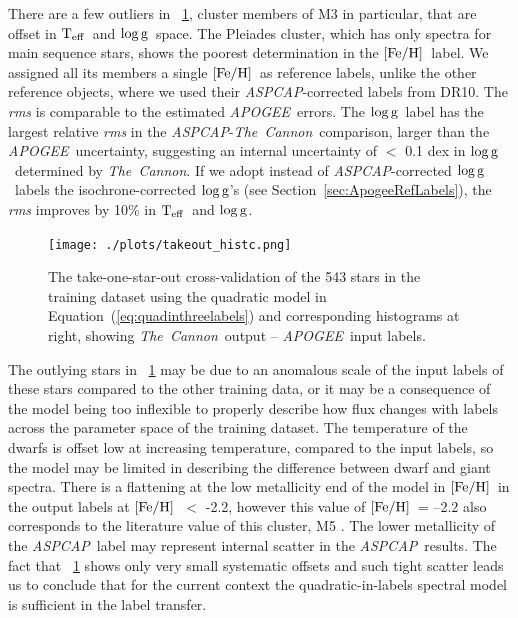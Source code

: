 \documentclass[12pt, preprint]{aastex}
\newcommand{\sectionname}{Section}
\newcommand{\tc}{\textsl{The~Cannon}}
\newcommand{\apogee}{\textsl{APOGEE}}
\newcommand{\aspcap}{\textsl{ASPCAP}}
\newcommand{\teff}{\mbox{$\rm T_{eff}$}}
\newcommand{\feh}{\mbox{$\rm [Fe/H]$}}
\newcommand{\logg}{\mbox{$\rm \log g$}}
\begin{document}
There are a few outliers in \figurename~\ref{fig:takeonestarout}, cluster members of M3 in particular, that are offset in \teff\ and \logg\ space. 
The Pleiades cluster, which has only spectra for main sequence stars, shows the poorest determination in the \feh\ label. We assigned all its members a single \feh ~as reference labels, unlike the other reference objects, where we used their \aspcap -corrected labels from DR10.
The \textit{rms} is comparable to the estimated \apogee\ errors. The \logg\ label has the largest relative \textit{rms} in the \aspcap\--\tc\ comparison, larger than the \apogee\ uncertainty, suggesting an internal uncertainty of $<$ 0.1 dex in \logg\ determined by \tc.
If we adopt instead of \aspcap -corrected \logg\ labels the isochrone-corrected \logg 's (see \sectionname~\ref{sec:ApogeeRefLabels}), the \textit{rms} improves by 10\% in \teff\ and \logg.

\begin{figure}[h!]
\centering
    \texttt{[image: ./plots/takeout\_histc.png]}
\caption{The take-one-star-out cross-validation of the 543 stars in the training dataset using the quadratic model in Equation~(\ref{eq:quadinthreelabels}) and corresponding histograms at right, showing \tc\ output -- \apogee\ input labels.}
\label{fig:takeonestarout}
\end{figure}


The outlying stars in \figurename~\ref{fig:takeonestarout} may be due to an anomalous scale of the input labels of these stars compared to the other training data, or it may be a consequence of the model being too inflexible to properly describe how flux changes with labels across the parameter space of the training dataset. 
The temperature of the dwarfs is offset low at increasing temperature, compared to the input labels, so the model may be limited in describing the difference between dwarf and giant spectra. 
There is a flattening at the low metallicity end of the model in \feh\ in the output labels at \feh\ $<$ -2.2, however this value of \feh\ = --2.2 also corresponds to the literature value of this cluster, M5 \citep{Meszaros2013}. 
The lower metallicity of the \aspcap\ label may represent internal scatter in the \aspcap\ results.
The fact that \figurename~\ref{fig:takeonestarout} shows only very small systematic offsets and such tight scatter leads us to conclude that for the
current context the quadratic-in-labels spectral model is sufficient in the label transfer. 
\end{document}
